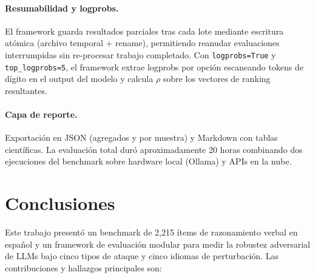 \documentclass[11pt]{article}
\begin{document}
\paragraph{Resumabilidad y logprobs.}
El framework guarda resultados parciales tras cada lote mediante
escritura atómica (archivo temporal + rename), permitiendo reanudar
evaluaciones interrumpidas sin re-procesar trabajo completado. Con
\texttt{logprobs=True} y \texttt{top\_logprobs=5}, el framework extrae
logprobs por opción escaneando tokens de dígito en el output del modelo
y calcula $\rho$ sobre los vectores de ranking resultantes.
 
\paragraph{Capa de reporte.}
Exportación en JSON (agregados y por muestra) y Markdown con tablas
científicas. La evaluación total duró aproximadamente 20 horas
combinando dos ejecuciones del benchmark sobre hardware local (Ollama)
y APIs en la nube.

 
\section{Conclusiones}
Este trabajo presentó un benchmark de 2{,}215 ítems de razonamiento
verbal en español y un framework de evaluación modular para medir la
robustez adversarial de LLMs bajo cinco tipos de ataque y cinco idiomas
de perturbación. Las contribuciones y hallazgos principales son:
 
\end{document}
